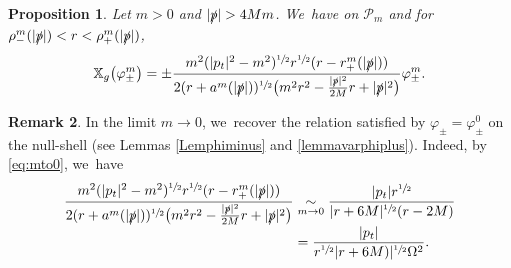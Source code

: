 \documentclass[10pt]{amsart}
\theoremstyle{plain}
\newtheorem{proposition}{Proposition}[section]
\theoremstyle{definition}
\newtheorem{remark}[proposition]{Remark}
\newcommand{\isEquivTo}[1]{\underset{#1}{\sim}}
\newcommand\T{{\mathbb{X}}}
\begin{document}
\begin{proposition}\label{Provarphicotang}
Let $m > 0$ and $|\slashed{p}| > 4Mm$. We~have on $\mathcal{P}_m$ and for $\rho_{-}^{m}(|\slashed{p}|) < r < \rho_{+}^{m}(|\slashed{p}|)$,\vspace*{-5pt}
\begin{equation*}
\T_g \bigl(\varphi_\pm^m \bigr)=\pm \frac{m^2(|p_t|^2-m^2)^{\sfrac{1}{2}}r^{\sfrac{1}{2}}(r-r^{m}_+(|\slashed{p}|))}{2(r+a^{m}(|\slashed{p}|))^{\sfrac{1}{2}}\bigl(m^2 r^2-\frac{|\slashed{p}|^2}{2M}r+|\slashed{p}|^2\bigr)}\varphi_{\pm}^m.
\end{equation*}
\end{proposition}
\begin{remark}\label{Rklimitmto0}
In the limit $m \to 0$, we~recover the relation satisfied by $\varphi_\pm = \varphi^0_\pm$ on the null-shell (see Lemmas \ref{Lemphiminus} and \ref{lemmavarphiplus}). Indeed, by \eqref{eq:mto0}, we~have\vspace*{-3pt}
\begin{align*}
\frac{m^2(|p_t|^2-m^2)^{\sfrac{1}{2}}r^{\sfrac{1}{2}}(r-r^{m}_+(|\slashed{p}|))}{2(r+a^{m}(|\slashed{p}|))^{\sfrac{1}{2}}\bigl(m^2 r^2-\frac{|\slashed{p}|^2}{2M}r+|\slashed{p}|^2\bigr)}
&\isEquivTo{m \to 0}\frac{|p_t|r^{\sfrac{1}{2}}}{|r+6M|^{\sfrac{1}{2}}(r-2M)}
\\[-3pt]
&=\frac{|p_t|}{r^{\sfrac{1}{2}}|r+6M)|^{\sfrac{1}{2}} \Omega^2}.
\end{align*}
\end{remark}
\end{document}

